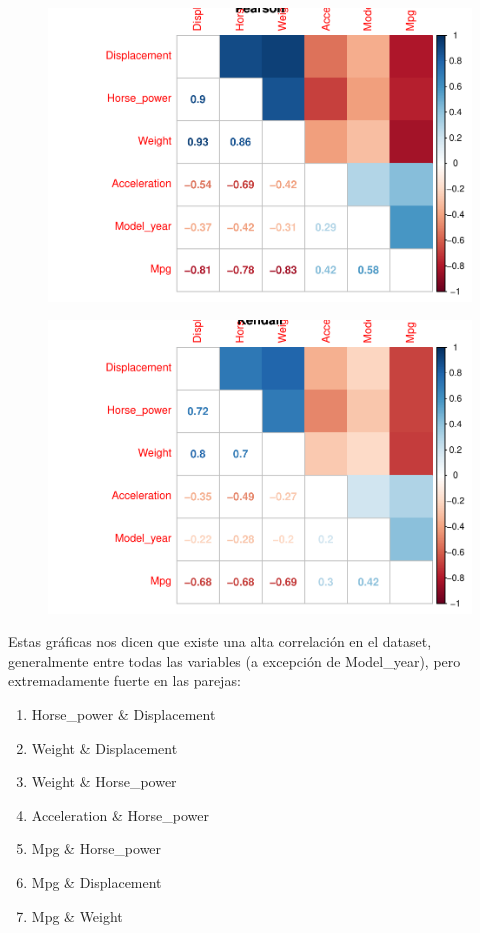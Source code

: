 \begin{figure}[H]\includegraphics[width=.9\linewidth]{img/EDA_files/figure-latex/unnamed-chunk-19-1} \caption{}\end{figure}
\begin{figure}[H]\includegraphics[width=.9\linewidth]{img/EDA_files/figure-latex/unnamed-chunk-19-2} \caption{}\end{figure}

Estas gráficas nos dicen que existe una alta correlación en el dataset, generalmente entre todas las variables (a excepción de Model\_year), pero extremadamente fuerte en las parejas:

\begin{enumerate}
    \def\labelenumi{\arabic{enumi}.}
    \item   Horse\_power \& Displacement
    \item   Weight \& Displacement
    \item   Weight \& Horse\_power
    \item   Acceleration \& Horse\_power
    \item   Mpg \& Horse\_power
    \item   Mpg \& Displacement
    \item   Mpg \& Weight
\end{enumerate}


